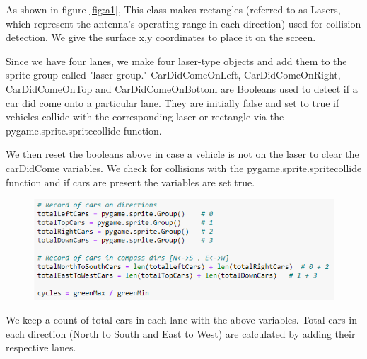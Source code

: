 \documentclass[12pt, a4paper,titlepage]{article}
\begin{document}
As shown in figure \ref{fig:a1}, This class makes rectangles (referred to as Lasers, which represent the antenna's operating range in each direction) used for collision detection. We give the surface x,y coordinates to place it on the screen. 

Since we have four lanes, we make four laser-type objects and add them to the sprite group called "laser group." CarDidComeOnLeft, CarDidComeOnRight, CarDidComeOnTop and CarDidComeOnBottom are Booleans used to detect if a car did come onto a particular lane. They are initially false and set to true if vehicles collide with the corresponding laser or rectangle via the pygame.sprite.spritecollide function.

We then reset the booleans above in case a vehicle is not on the laser to clear the carDidCome variables. We check for collisions with the pygame.sprite.spritecollide function and if cars are present the variables are set true.

\begin{figure}[H]
	\centering
	\includegraphics[width=\linewidth]{images/a2}
	\caption{}
	\label{fig:a2}
\end{figure}

We keep a count of total cars in each lane with the above variables. Total cars in each direction (North to South and East to West) are calculated by adding their respective lanes.
\end{document}
